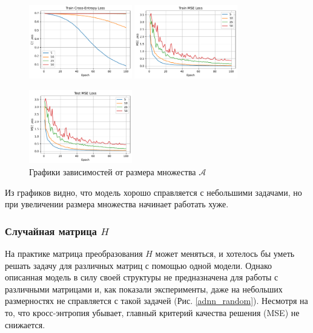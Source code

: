\documentclass[12pt]{article}
\begin{document}
\begin{figure}
    \centering
    \includegraphics[width=0.4\textwidth]{adnn_M_epoch_train_loss.pdf}
    \quad
    \includegraphics[width=0.4\textwidth]{adnn_M_epoch_train_mse.pdf}
    
    \includegraphics[width=0.4\textwidth]{adnn_M_epoch_test_mse.pdf}
    \caption{Графики зависимостей от размера множества $\mathcal{A}$}
    \label{adnn_M}
\end{figure}

Из графиков видно, что модель хорошо справляется с небольшими задачами, но при увеличении размера множества начинает работать хуже.

\subsubsection{Случайная матрица \texorpdfstring{$H$}{H}}

На практике матрица преобразования $H$ может меняться, и хотелось бы уметь решать задачу для различных матриц с помощью одной модели. Однако описанная модель в силу своей структуры не предназначена для работы с различными матрицами и, как показали эксперименты, даже на небольших размерностях не справляется с такой задачей (Рис. \ref{adnn_random}). Несмотря на то, что кросс-энтропия убывает, главный критерий качества решения (MSE) не снижается.
\end{document}
